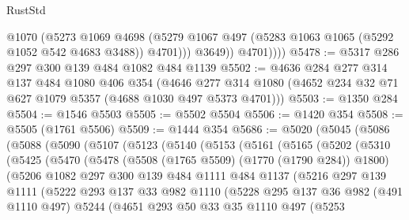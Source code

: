 \begin{lexlean}{RustStd}
\begin{coremodule}
{\begin{coremodule}
{{{{{{{{{{{{{{                  @1070
                  (@5273
                    @1069
                    @4698
                    (@5279 @1067 @497 (@5283 @1063 @1065 (@5292 @1052 @542 @4683 @3488)) @4701)))
                @3649))
            @4701))))
@5478 := @5317 @286 @297 @300 @139 @484 @1082 @484 @1139
@5502 := @4636
    @284
    @277
    @314
    @137
    @484
    @1080
    @406
    @354
    (@4646 @277 @314 @1080 (@4652 @234 @32 @71 @627 @1079 @5357 (@4688 @1030 @497 @5373 @4701)))
@5503 := @1350 @284
@5504 := @1546 @5503
@5505 := @5502 @5504
@5506 := @1420 @354
@5508 := @5505 (@1761 @5506)
@5509 := @1444 @354
@5686 := @5020
    (@5045
      (@5086
        (@5088
          (@5090
            (@5107
              (@5123
                (@5140
                  (@5153
                    (@5161
                      (@5165
                        (@5202
                          (@5310
                            (@5425
                              (@5470
                                (@5478
                                  (@5508 (@1765 @5509) (@1770 (@1790 @284)) @1800)
                                  (@5206
                                    @1082
                                    @297
                                    @300
                                    @139
                                    @484
                                    @1111
                                    @484
                                    @1137
                                    (@5216
                                      @297
                                      @139
                                      @1111
                                      (@5222
                                        @293
                                        @137
                                        @33
                                        @982
                                        @1110
                                        (@5228
                                          @295
                                          @137
                                          @36
                                          @982
                                          (@491 @1110 @497)
                                          @5244
                                          (@4651
                                            @293
                                            @50
                                            @33
                                            @35
                                            @1110
                                            @497
                                            (@5253
}}}}}}}}}}}}}}
\end{coremodule}}
\end{coremodule}
\end{lexlean}
